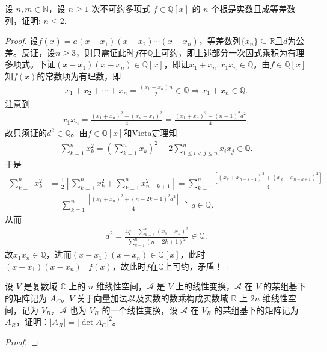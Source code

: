 \documentclass[../../main.tex]{subfiles}
\begin{document}
\begin{example}
设 \( n,m \in \mathbb{N} \)，设 \( n \geqslant 1 \) 次不可约多项式 \( f \in \mathbb{Q}[x] \) 的 \( n \) 个根是实数且成等差数列，证明: \( n \leqslant 2 \).
\end{example}
\begin{proof}
设$f(x)=a(x-x_1)(x-x_2)\cdots(x-x_n)$，等差数列$\{x_n\}\subseteq\mathbb{R}$且$d$为公差。反证，设$n\geqslant 3$，则只需证此时$f$在$\mathbb{Q}$上可约，即上述部分一次因式乘积为有理多项式。下证$(x-x_1)(x-x_n)\in\mathbb{Q}[x]$，即证$x_1+x_n,x_1x_n\in\mathbb{Q}$。由$f\in\mathbb{Q}[x]$知$f(x)$的常数项为有理数，即
\begin{align*}
x_1+x_2+\cdots+x_n=\frac{(x_1+x_n)n}{2}\in\mathbb{Q}\Longrightarrow x_1+x_n\in\mathbb{Q}.
\end{align*}
注意到
\begin{align*}
x_1x_n=\frac{(x_1+x_n)^2-(x_n-x_1)^2}{4}=\frac{(x_1+x_n)^2-(n-1)^2d^2}{4},
\end{align*}
故只须证的$d^2\in\mathbb{Q}$。由$f\in\mathbb{Q}[x]$和Vieta定理知
\begin{align*}
\sum_{k=1}^n x_k^2=\left(\sum_{k=1}^n x_k\right)^2-2\sum_{1\leqslant i<j\leqslant n}^n x_ix_j\in\mathbb{Q}.
\end{align*}
于是
\begin{align*}
\sum_{k=1}^n x_k^2&=\frac{1}{2}\left[\sum_{k=1}^n x_k^2+\sum_{k=1}^n x_{n-k+1}^2\right]=\sum_{k=1}^n \frac{\left[(x_k+x_{n-k+1})^2+(x_k-x_{n-k+1})^2\right]}{4}\\
&=\sum_{k=1}^n \frac{\left[(x_1+x_n)^2+(n-2k+1)^2d^2\right]}{4}\triangleq q\in\mathbb{Q}.
\end{align*}
从而
\begin{align*}
d^2=\frac{4q-\sum\limits_{k=1}^n (x_1+x_n)^2}{\sum\limits_{k=1}^n (n-2k+1)^2}\in\mathbb{Q}.
\end{align*}
故$x_1x_n\in\mathbb{Q}$，进而$(x-x_1)(x-x_n)\in\mathbb{Q}[x]$，此时$(x-x_1)(x-x_n)\mid f(x)$，故此时$f$在$\mathbb{Q}$上可约，矛盾！

\end{proof}

\begin{proposition}[复矩阵行列式模长平方等于其实化后实矩阵的行列式]\label{proposition:复矩阵行列式模长平方等于其实化后实矩阵的行列式}
设 \( V \) 是复数域 \( \mathbb{C} \) 上的 \( n \) 维线性空间，\( \mathcal{A} \) 是 \( V \) 上的线性变换，\( \mathcal{A} \) 在 \( V \) 的某组基下的矩阵记为 \( A_{C} \)。\( V \) 关于向量加法以及实数的数乘构成实数域 \( \mathbb{R} \) 上 \( 2n \) 维线性空间，记为 \( V_{R} \)，\( \mathcal{A} \) 也为 \( V_{R} \) 的一个线性变换，设 \( \mathcal{A} \) 在 \( V_{R} \) 的某组基下的矩阵记为 \( A_{R} \)，证明：\( |A_{R}| = |\det A_{C}|^{2} \)。
\end{proposition}
\begin{proof}


\end{proof}
\end{document}
